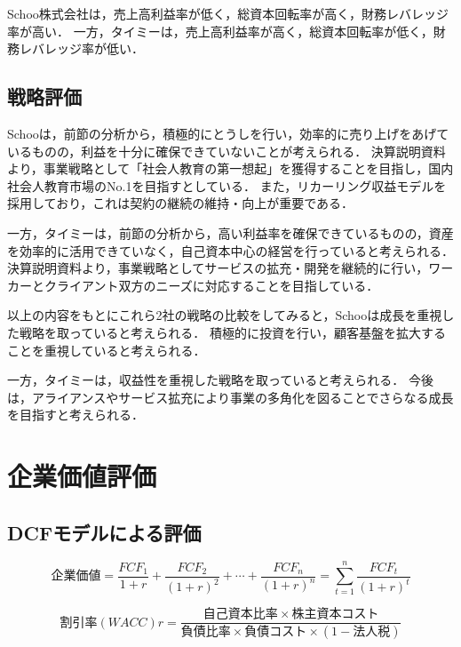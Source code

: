 \documentclass[a4paper]{ltjsarticle}
\begin{document}
Schoo株式会社は，売上高利益率が低く，総資本回転率が高く，財務レバレッジ率が高い．
一方，タイミーは，売上高利益率が高く，総資本回転率が低く，財務レバレッジ率が低い．

\subsection{戦略評価}
Schooは，前節の分析から，積極的にとうしを行い，効率的に売り上げをあげているものの，利益を十分に確保できていないことが考えられる．
決算説明資料より，事業戦略として「社会人教育の第一想起」を獲得することを目指し，国内社会人教育市場のNo.1を目指すとしている．
また，リカーリング収益モデルを採用しており，これは契約の継続の維持・向上が重要である．

一方，タイミーは，前節の分析から，高い利益率を確保できているものの，資産を効率的に活用できていなく，自己資本中心の経営を行っていると考えられる．
決算説明資料より，事業戦略としてサービスの拡充・開発を継続的に行い，ワーカーとクライアント双方のニーズに対応することを目指している．

以上の内容をもとにこれら2社の戦略の比較をしてみると，Schooは成長を重視した戦略を取っていると考えられる．
積極的に投資を行い，顧客基盤を拡大することを重視していると考えられる．

一方，タイミーは，収益性を重視した戦略を取っていると考えられる．
今後は，アライアンスやサービス拡充により事業の多角化を図ることでさらなる成長を目指すと考えられる．

\section{企業価値評価}
\subsection{DCFモデルによる評価}

\[
企業価値 = \frac{FCF_1}{1 + r} + \frac{FCF_2}{(1 + r)^2} + \cdots + \frac{FCF_n}{(1 + r)^n}
= \sum_{t=1}^{n} \frac{FCF_t}{(1 + r)^t}
\]

\[
割引率(WACC) r = \frac{自己資本比率 \times 株主資本コスト}{負債比率 \times 負債コスト \times (1 - 法人税)}
\]
\end{document}
